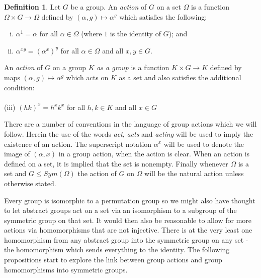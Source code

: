 \documentclass[]{article}
\theoremstyle{definition}
\newtheorem{defn}[thm]{Definition}
\begin{document}
\begin{defn}
	Let $G$ be a group. An \emph{action} of $G$ on a set $\Omega$ is a function $\Omega \times G \rightarrow \Omega$ defined by $(\alpha,g) \mapsto \alpha^g$ which satisfies the following:
\begin{enumerate}[(i)]
    \item $\alpha^1 = \alpha$ for all $\alpha \in \Omega$ (where $1$ is the identity of $G$); and
\vspace{-0.2cm} \item $\alpha^{xy} = (\alpha^x)^y$ for all $\alpha \in \Omega$ and all $x,y \in G$.
\end{enumerate}
An \emph{action} of $G$ on a group $K$ \emph{as a group} is a function $K \times G \rightarrow K$ defined by maps $(\alpha,g) \mapsto \alpha^g$ which acts on $K$ as a set and also satisfies the additional condition: \\ \vspace{-0.2cm} \\
\phantom{i} (iii) $(hk)^x = h^x k^x$ for all $h, k \in K$ and all $x \in G$
\end{defn}
There are a number of conventions in the language of group actions which we will follow. Herein the use of the words \emph{act}, \emph{acts} and \emph{acting} will be used to imply the existence of an action. The superscript notation $\alpha^x$ will be used to denote the image of $(\alpha,x)$ in a group action, when the action is clear. When an action is defined on a set, it is implied that the set is nonempty. Finally whenever $\Omega$ is a set and $G \leqslant Sym(\Omega)$ the action of $G$ on $\Omega$ will be the natural action unless otherwise stated.

Every group is isomorphic to a permutation group so we might also have thought to let abstract groups act on a set via an isomorphism to a subgroup of the symmetric group on that set. It would then also be reasonable to allow for more actions via homomorphisms that are not injective. There is at the very least one homomorphism from any abstract group into the symmetric group on any set - the homomorphism which sends everything to the identity. The following propositions start to explore the link between group actions and group homomorphisms into symmetric groups.
\end{document}
